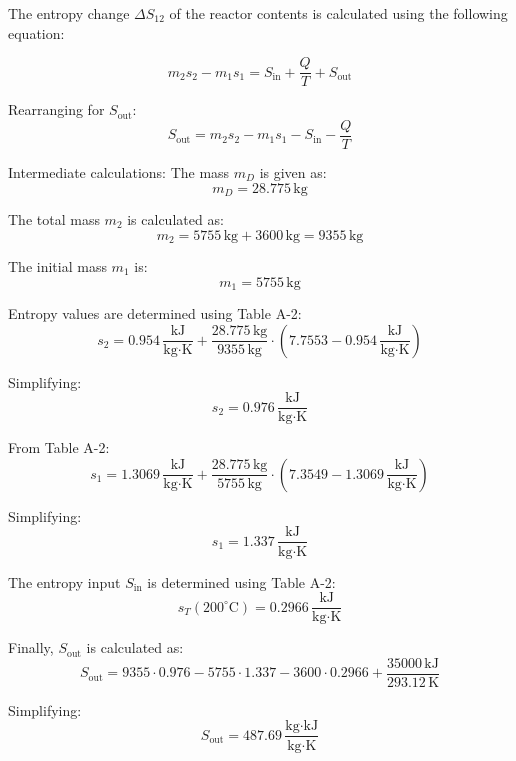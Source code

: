 The entropy change \( \Delta S_{12} \) of the reactor contents is calculated using the following equation:  

\[
m_{2} s_{2} - m_{1} s_{1} = S_{\text{in}} + \frac{Q}{T} + S_{\text{out}}
\]  

Rearranging for \( S_{\text{out}} \):  
\[
S_{\text{out}} = m_{2} s_{2} - m_{1} s_{1} - S_{\text{in}} - \frac{Q}{T}
\]  

Intermediate calculations:  
The mass \( m_{D} \) is given as:  
\[
m_{D} = 28.775 \, \text{kg}
\]  

The total mass \( m_{2} \) is calculated as:  
\[
m_{2} = 5755 \, \text{kg} + 3600 \, \text{kg} = 9355 \, \text{kg}
\]  

The initial mass \( m_{1} \) is:  
\[
m_{1} = 5755 \, \text{kg}
\]  

Entropy values are determined using Table A-2:  
\[
s_{2} = 0.954 \, \frac{\text{kJ}}{\text{kg·K}} + \frac{28.775 \, \text{kg}}{9355 \, \text{kg}} \cdot (7.7553 - 0.954 \, \frac{\text{kJ}}{\text{kg·K}})
\]  

Simplifying:  
\[
s_{2} = 0.976 \, \frac{\text{kJ}}{\text{kg·K}}
\]  

From Table A-2:  
\[
s_{1} = 1.3069 \, \frac{\text{kJ}}{\text{kg·K}} + \frac{28.775 \, \text{kg}}{5755 \, \text{kg}} \cdot (7.3549 - 1.3069 \, \frac{\text{kJ}}{\text{kg·K}})
\]  

Simplifying:  
\[
s_{1} = 1.337 \, \frac{\text{kJ}}{\text{kg·K}}
\]  

The entropy input \( S_{\text{in}} \) is determined using Table A-2:  
\[
s_{T}(200^\circ\text{C}) = 0.2966 \, \frac{\text{kJ}}{\text{kg·K}}
\]  

Finally, \( S_{\text{out}} \) is calculated as:  
\[
S_{\text{out}} = 9355 \cdot 0.976 - 5755 \cdot 1.337 - 3600 \cdot 0.2966 + \frac{35000 \, \text{kJ}}{293.12 \, \text{K}}
\]  

Simplifying:  
\[
S_{\text{out}} = 487.69 \, \frac{\text{kg·kJ}}{\text{kg·K}}
\]